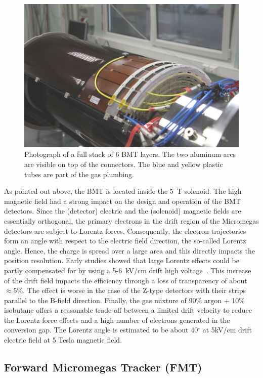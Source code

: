 \begin{figure}[htb]
 \includegraphics[width=1.0\columnwidth,keepaspectratio]{images/fig5}
 \caption{Photograph of a full stack of 6 BMT layers. The two aluminum arcs are visible on top of the connectors. The blue and
   yellow plastic tubes are part of the gas plumbing.}
 \label{fig:mm-fig4}
\end{figure}

As pointed out above, the BMT is located inside the 5~T solenoid. The high magnetic field had a strong impact on the design and
operation of the BMT detectors. Since the (detector) electric and the (solenoid) magnetic fields are essentially orthogonal, the
primary electrons in the drift region of the Micromegas detectors are subject to Lorentz forces. Consequently, the electron
trajectories form an angle with respect to the electric field direction, the so-called Lorentz angle. Hence, the charge is spread
over a large area and this directly impacts the position resolution. Early studies showed that large Lorentz effects could be
partly compensated for by using a 5-6~kV/cm drift high voltage~\cite{KONCZYKOWSKI2010274}. This increase of the drift
field impacts the efficiency through a loss of transparency of about \(\approx5\%\). The effect is worse in the case of the
Z-type detectors with their strips parallel to the B-field direction. Finally, the gas mixture of 90\% argon + 10\% isobutane
offers a reasonable trade-off between a limited drift velocity to reduce the Lorentz force effects and a high number of
electrons generated in the conversion gap. The Lorentz angle is estimated to be about 40$^\circ$ at 5kV/cm drift electric field at 5 Tesla magnetic field.

\subsection{Forward Micromegas Tracker (FMT)}

